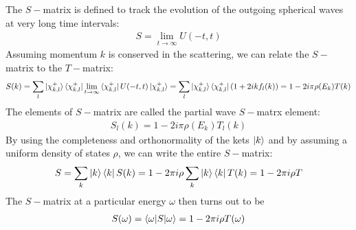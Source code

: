 The \(S-\)matrix is defined to track the evolution of the outgoing spherical waves at very long time intervals:
\begin{equation}\begin{aligned}
	S = \lim_{t \to \infty} U(-t, t)
\end{aligned}\end{equation}
Assuming momentum \(k\) is conserved in the scattering, we can relate the \(S-\)matrix to the \(T-\)matrix:
\begin{equation}\begin{aligned}
	\label{S_k_def}
	S(k) = \sum_l \ket{\chi^+_{k,l}} \bra{\chi^+_{k,l}}\lim_{t \to \infty} \bra{\chi^+_{k,l}}U(-t, t)\ket{\chi^+_{k,l}} = \sum_l \ket{\chi^+_{k,l}} \bra{\chi^+_{k,l}}\left(1 + 2ikf_l(k)\right) = 1 - 2i \pi \rho(E_k) T(k)
\end{aligned}\end{equation}
The elements of \(S-\)matrix are called the partial wave \(S-\)matrx element:
\begin{equation}\begin{aligned}
	S_l(k) = 1 - 2i \pi \rho(E_k)T_l(k)
\end{aligned}\end{equation}
By using the completeness and orthonormality of the kets \(\ket{k}\) and by assuming a uniform density of states \(\rho\), we can write the entire \(S-\)matrix:
\begin{equation}\begin{aligned}
	S = \sum_k \ket{k}\bra{k} S(k) = 1 - 2\pi i \rho \sum_k \ket{k}\bra{k} T(k) = 1 - 2\pi i \rho T
\end{aligned}\end{equation}
The \(S-\)matrix at a particular energy \(\omega\) then turns out to be
\begin{equation}\begin{aligned}
	\label{S_in_T}
	S(\omega) = \braket{\omega| S | \omega} = 1 - 2\pi i \rho T(\omega)
\end{aligned}\end{equation}

